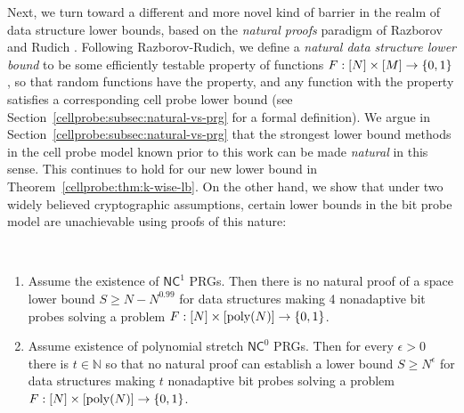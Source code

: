 Next, we turn toward a different and more novel kind of barrier in the realm of data structure lower bounds, based on the \emph{natural proofs} paradigm of Razborov and Rudich \cite{natural-proofs}. Following Razborov-Rudich, we define a \emph{natural data structure lower bound} to be some efficiently testable property of functions $F:[N] \times [M] \to \{0,1\}$, so that random functions have the property, and any function with the property satisfies a corresponding cell probe lower bound (see Section~\ref{cellprobe:subsec:natural-vs-prg} for a formal definition).
We argue in Section~\ref{cellprobe:subsec:natural-vs-prg} that the strongest lower bound methods in the cell probe model known prior to this work can be made \emph{natural} in this sense. This continues to hold for our new lower bound in Theorem~\ref{cellprobe:thm:k-wise-lb}.
On the other hand, we show that under two widely believed cryptographic assumptions, certain lower bounds in the bit probe model are unachievable using proofs of this nature:
\begin{theorem}
\label{cellprobe:thm:nat-prop-barrier}
~
\begin{enumerate}
    \item Assume the existence of $\mathsf{NC}^1$ PRGs. Then there is no natural proof of a space lower bound $S \geq N - N^{0.99}$ for data structures making 4 nonadaptive bit probes solving a problem $F: [N] \times [\mathrm{poly}(N)] \to \{0,1\}$.
    \item Assume existence of polynomial stretch $\mathsf{NC}^0$ PRGs. Then for every $\epsilon>0$ there is $t \in \mathbb{N}$ so that no natural proof can establish a lower bound $S \geq N^{\epsilon}$ for data structures making $t$ nonadaptive bit probes solving a problem $F: [N] \times [\mathrm{poly}(N)] \to \{0,1\}$.
\end{enumerate}
\end{theorem}
